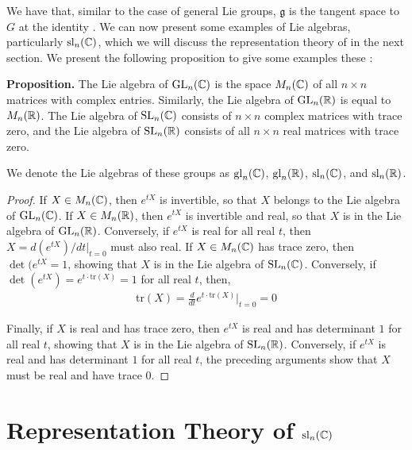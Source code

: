 \documentclass[11pt, a4paper, oneside]{article}
\theoremstyle{plain}
\theoremstyle{definition}
\theoremstyle{example}
\def\GL{\mathrm{GL}} \def\SL{\mathrm{SL}} \def\sl{\mathrm{sl}} \def\gl{\mathrm{gl}} \def\SO{\mathrm{SO}} \def\SU{\mathrm{SU}}  \def\SP{\mathrm{SP}} \def\g{\mathfrak{g}} \def\h{\mathfrak{h}} \def\Sym{\mathrm{Sym}}
\def\tr{\mathrm{tr}}
\begin{document}
\par
We have that, similar to the case of general Lie groups, $\mathfrak{g}$ is the tangent space to $G$ at the identity \cite[\S 3.3]{hall}. We can now present some examples of Lie algebras, particularly $\sl_n(\CC)$, which we will discuss the representation theory of in the next section. We present the following proposition to give some examples these \cite[\S 3.4, Proposition 3.23]{hall}:

\par
\textbf{Proposition.} The Lie algebra of $\GL_n(\CC)$ is the space $M_n(\mathbb{C})$ of all $n \times n$ matrices with complex entries. Similarly, the Lie algebra of $\GL_n(\RR)$ is equal to $M_n(\mathbb{R})$. The Lie algebra of $\SL_n(\CC)$ consists of $n \times n$ complex matrices with trace zero, and the Lie algebra of $\SL_n(\RR)$ consists of all $n \times n$ real matrices with trace zero.

\par
We denote the Lie algebras of these groups as $\gl_n(\CC)$, $\gl_n(\RR)$, $\sl_n(\CC)$, and $\sl_n(\RR)$.

\begin{proof}
If $X \in M_n(\mathbb{C})$, then $e^{tX}$ is invertible, so that $X$ belongs to the Lie algebra of $\GL_n(\CC)$. If $X \in M_n(\mathbb{R})$, then $e^{tX}$ is invertible and real, so that $X$ is in the Lie algebra of $\GL_n(\RR)$. Conversely, if $e^{tX}$ is real for all real $t$, then $X = d(e^{tX})/dt |_{t = 0}$ must also real. If $X \in M_n(\mathbb{C})$ has trace zero, then $\det(e^{tX} = 1$, showing that $X$ is in the Lie algebra of $\SL_n(\CC)$. Conversely, if $\det(e^{tX}) = e^{t \cdot \tr(X)} = 1$ for all real $t$, then,
\begin{align*}
\tr(X) = \frac{d}{dt} e^{t \cdot \tr(X)} \rvert_{t=0} = 0
\end{align*}

Finally, if $X$ is real and has trace zero, then $e^{tX}$ is real and has determinant $1$ for all real $t$, showing that $X$ is in the Lie algebra of $\SL_n(\RR)$. Conversely, if $e^{tX}$ is real and has determinant $1$ for all real $t$, the preceding arguments show that $X$ must be real and have trace $0$.
\end{proof}



\section{Representation Theory of $\sl_n(\CC)$}
\end{document}
